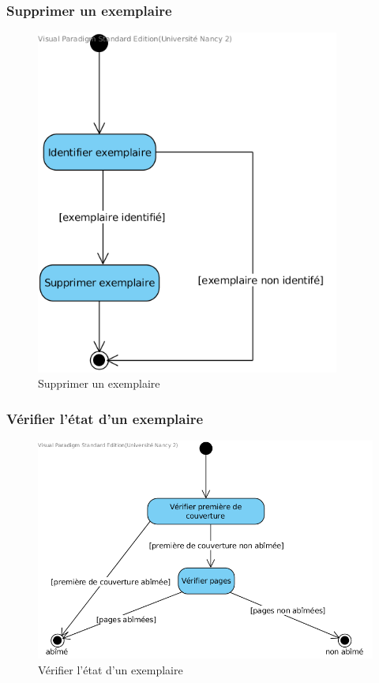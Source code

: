 \documentclass[a4paper,12pt]{article}
\begin{document}
\clearpage
\subsubsection{Supprimer un exemplaire}
\label{sec:orgheadline26}

\begin{figure}[!htpb]
\centering
\includegraphics[width=10cm]{./res/img/supprimer-exemplaire.png}
\caption{\label{fig:orgparagraph17}
Supprimer un exemplaire}
\end{figure}

\clearpage
\subsubsection{Vérifier l’état d’un exemplaire}
\label{sec:orgheadline27}

\begin{figure}[htb]
\centering
\includegraphics[width=.9\linewidth]{./res/img/verifier-etat-exemplaire.png}
\caption{\label{fig:orgparagraph18}
Vérifier l’état d’un exemplaire}
\end{figure}
\end{document}
